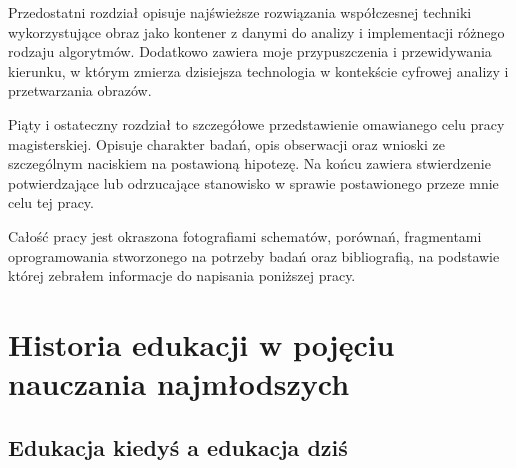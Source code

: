 \documentclass{article}
\begin{document}
	\par
	Przedostatni rozdział opisuje najświeższe rozwiązania współczesnej techniki wykorzystujące obraz jako kontener z danymi do analizy i implementacji różnego rodzaju algorytmów. Dodatkowo zawiera moje przypuszczenia i przewidywania kierunku, w którym zmierza dzisiejsza technologia w kontekście cyfrowej analizy i przetwarzania obrazów.
	\par
	Piąty i ostateczny rozdział to szczegółowe przedstawienie omawianego celu pracy magisterskiej. Opisuje charakter badań, opis obserwacji oraz wnioski ze szczególnym \linebreak naciskiem na postawioną hipotezę. Na końcu zawiera stwierdzenie potwierdzające lub odrzucające stanowisko w sprawie postawionego przeze mnie celu tej pracy.
	\par
	Całość pracy jest okraszona fotografiami schematów, porównań, fragmentami oprogramowania stworzonego na potrzeby badań oraz bibliografią, na podstawie której zebrałem informacje do napisania poniższej pracy.
	
	\section{Historia edukacji w pojęciu nauczania najmłodszych}
	\subsection{Edukacja kiedyś a edukacja dziś}
	
\end{document}
